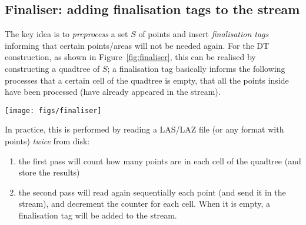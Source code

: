 \subsection{Finaliser: adding finalisation tags to the stream}
The key idea is to \emph{preprocess} a set $S$ of points and insert \emph{finalisation tags} informing that certain points/areas will not be needed again.
For the DT construction, as shown in Figure~\ref{fig:finaliser}, this can be realised by constructing a quadtree of $S$; a finalisation tag basically informs the following processes that a certain cell of the quadtree is empty, that all the points inside have been processed (have already appeared in the stream).
\begin{figure*}
  \centering
  \texttt{[image: figs/finaliser]}
  \caption{How the finaliser modifies to input and injects finalisation tags. \textbf{Left:} 9 points and the related streams (just a list of the points with coordinates). \textbf{Right:} if a quadtree of depth 1 (in orange) is used (with 4 cells), then the stream would be augmented with finalisation tags.}%
\label{fig:finaliser}
\end{figure*}

In practice, this is performed by reading a LAS/LAZ file (or any format with points) \emph{twice} from disk: 
\begin{enumerate}
  \item the first pass will count how many points are in each cell of the quadtree (and store the results)
  \item the second pass will read again sequentially each point (and send it in the stream), and decrement the counter for each cell. When it is empty, a finalisation tag will be added to the stream.
\end{enumerate}


